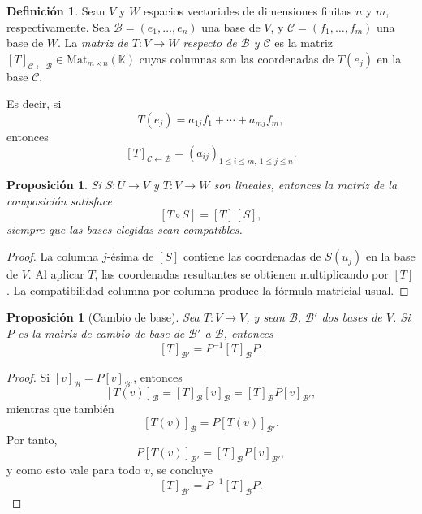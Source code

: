 \documentclass[10pt,a4paper,oneside]{article}
\theoremstyle{plain}
\newtheorem{proposition}[theorem]{Proposición}
\theoremstyle{definition}
\newtheorem{definition}[theorem]{Definición}
\theoremstyle{remark}
\newcommand{\K}{\mathbb{K}}
\newcommand{\Mat}{\mathrm{Mat}}
\begin{document}
\begin{definition}
Sean \(V\) y \(W\) espacios vectoriales de dimensiones finitas \(n\) y \(m\), respectivamente. Sea \(\mathcal{B}=(e_1,\dots,e_n)\) una base de \(V\), y \(\mathcal{C}=(f_1,\dots,f_m)\) una base de \(W\). La \emph{matriz de \(T:V\to W\) respecto de \(\mathcal{B}\) y \(\mathcal{C}\)} es la matriz \([T]_{\mathcal{C}\leftarrow \mathcal{B}}\in \Mat_{m\times n}(\K)\) cuyas columnas son las coordenadas de \(T(e_j)\) en la base \(\mathcal{C}\).
\end{definition}

Es decir, si
\[
T(e_j)=a_{1j}f_1+\cdots+a_{mj}f_m,
\]
entonces
\[
[T]_{\mathcal{C}\leftarrow \mathcal{B}}=(a_{ij})_{1\le i\le m,\ 1\le j\le n}.
\]

\begin{proposition}
Si \(S:U\to V\) y \(T:V\to W\) son lineales, entonces la matriz de la composición satisface
\[
[T\circ S]=[T]\,[S],
\]
siempre que las bases elegidas sean compatibles.
\end{proposition}

\begin{proof}
La columna \(j\)-ésima de \([S]\) contiene las coordenadas de \(S(u_j)\) en la base de \(V\). Al aplicar \(T\), las coordenadas resultantes se obtienen multiplicando por \([T]\). La compatibilidad columna por columna produce la fórmula matricial usual. \end{proof}

\begin{proposition}[Cambio de base]
Sea \(T:V\to V\), y sean \(\mathcal{B}\), \(\mathcal{B}'\) dos bases de \(V\). Si \(P\) es la matriz de cambio de base de \(\mathcal{B}'\) a \(\mathcal{B}\), entonces
\[
[T]_{\mathcal{B}'}=P^{-1}[T]_{\mathcal{B}}P.
\]
\end{proposition}

\begin{proof}
Si \([v]_{\mathcal{B}}=P[v]_{\mathcal{B}'}\), entonces
\[
[T(v)]_{\mathcal{B}}=[T]_{\mathcal{B}}[v]_{\mathcal{B}}=[T]_{\mathcal{B}}P[v]_{\mathcal{B}'},
\]
mientras que también
\[
[T(v)]_{\mathcal{B}}=P[T(v)]_{\mathcal{B}'}. 
\]
Por tanto,
\[
P[T(v)]_{\mathcal{B}'}=[T]_{\mathcal{B}}P[v]_{\mathcal{B}'},
\]
y como esto vale para todo \(v\), se concluye
\[
[T]_{\mathcal{B}'}=P^{-1}[T]_{\mathcal{B}}P.
\]
\end{proof}

\begin{center}
\end{center}
\end{document}
